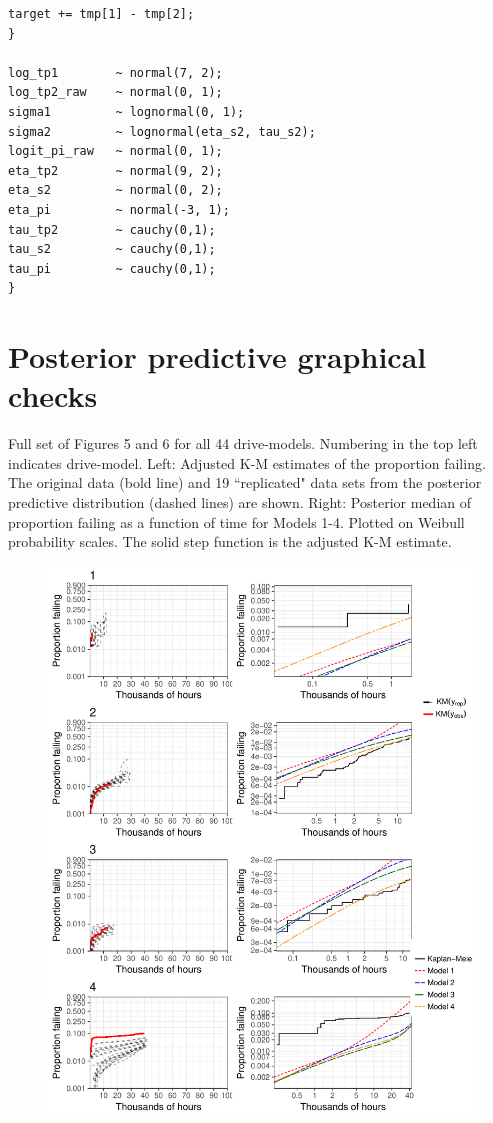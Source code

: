 \documentclass[12pt]{article}
\begin{document}
{\begin{verbatim}
target += tmp[1] - tmp[2];
}

log_tp1        ~ normal(7, 2);
log_tp2_raw    ~ normal(0, 1);
sigma1         ~ lognormal(0, 1);
sigma2         ~ lognormal(eta_s2, tau_s2);
logit_pi_raw   ~ normal(0, 1);
eta_tp2        ~ normal(9, 2);
eta_s2         ~ normal(0, 2);
eta_pi         ~ normal(-3, 1);
tau_tp2        ~ cauchy(0,1);
tau_s2         ~ cauchy(0,1);
tau_pi         ~ cauchy(0,1);
}

\end{verbatim}
}

\pagebreak
\section{Posterior predictive graphical checks}
Full set of Figures 5 and 6 for all 44 drive-models.  Numbering in the top left indicates drive-model.  Left: Adjusted K-M estimates of the proportion failing.  The original data (bold line) and 19 ``replicated" data sets from the posterior predictive distribution (dashed lines) are shown.  Right: Posterior median of proportion failing as a function of time for Models 1-4.  Plotted on Weibull probability scales.  The solid step function is the adjusted K-M estimate.  
\begin{figure}[H]
\includegraphics[width=\textwidth]{ppcheck-v2-1.pdf}
\end{figure}
\end{document}
